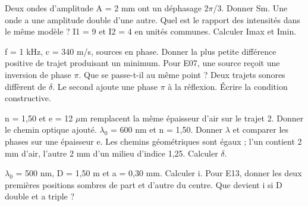 Deux ondes d’amplitude A = 2 mm ont un déphasage 2\ensuremath{\pi}/3. Donner Sm.
Une onde a une amplitude double d’une autre. Quel est le rapport des intensités dans le même modèle ?
I1 = 9 et I2 = 4 en unités communes. Calculer Imax et Imin.


f = 1 kHz, c = 340 m/s, sources en phase. Donner la plus petite différence positive de trajet produisant un minimum.
Pour E07, une source reçoit une inversion de phase \ensuremath{\pi}. Que se passe-t-il au même point ?
Deux trajets sonores diffèrent de \ensuremath{\delta}. Le second ajoute une phase \ensuremath{\pi} à la réflexion. Écrire la condition constructive.


n = 1,50 et e = 12 \ensuremath{\mu}m remplacent la même épaisseur d’air sur le trajet 2. Donner le chemin optique ajouté.
\ensuremath{\lambda_0} = 600 nm et n = 1,50. Donner \ensuremath{\lambda} et comparer les phases sur une épaisseur e.
Les chemins géométriques sont égaux ; l’un contient 2 mm d’air, l’autre 2 mm d’un milieu d’indice 1,25. Calculer \ensuremath{\delta}.


\ensuremath{\lambda_0} = 500 nm, D = 1,50 m et a = 0,30 mm. Calculer i.
Pour E13, donner les deux premières positions sombres de part et d’autre du centre.
Que devient i si D double et a triple ?


